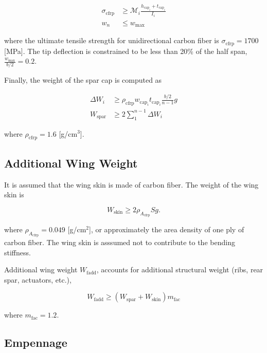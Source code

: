 \begin{align}
    \label{e:stresscont}
    \sigma_{\text{cfrp}} &\geq \mathcal{M}_i \frac{h_{\text{cap}_i}+t_{\text{cap}_i}}{I_i}\\
    \label{e:defcont}
    w_n &\leq w_{\text{max}}
\end{align}

where the ultimate tensile strength for unidirectional carbon fiber is $\sigma_{\text{cfrp}} = 1700$ [MPa].\cite{cfprop}
The tip deflection is constrained to be less than 20\% of the half span, $\frac{w_{\text{max}}}{b/2} = 0.2$.

Finally, the weight of the spar cap is computed as

\begin{align}
    \label{e:sparmass}
    \Delta W_i &\geq \rho_{\text{cfrp}} w_{\text{cap}_i}t_{\text{cap}_i} \frac{b/2}{n-1}g \\
    \label{e:sparmasssum}
    W_{\text{spar}} &\geq 2 \sum\limits_{1}^{n-1} \Delta W_i
\end{align}

where $\rho_{\text{cfrp}} = 1.6$ [g/cm$^3$].\cite{cfply}

\subsection{Additional Wing Weight}

It is assumed that the wing skin is made of carbon fiber.  The weight of the wing skin is 

\begin{equation}
    \label{e:wingskinweight}
    W_{\text{skin}} \geq 2 \rho_{A_{\text{cfrp}}} S g.
\end{equation}

where $\rho_{A_{\text{cfrp}}} = 0.049$ [g/cm$^2$], or approximately the area density of one ply of carbon fiber.\cite{cfply} The wing skin is asssumed not to contribute to the bending stiffness. 

Additional wing weight $W_{\text{fadd}}$, accounts for additional structural weight (ribs, rear spar, actuators, etc.),

\begin{equation}
    W_{\text{fadd}} \geq (W_{\text{spar}} + W_{\text{skin}}) m_{\text{fac}}
\end{equation}

where $m_{\text{fac}} = 1.2$.


\subsection{Empennage}

